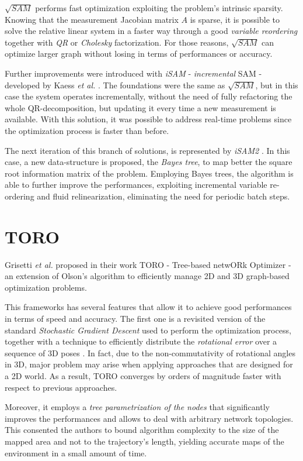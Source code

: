 $\sqrt{SAM}$ performs fast optimization exploiting the problem's intrinsic sparsity. Knowing that the measurement Jacobian matrix $A$ is sparse, it is possible to solve the relative linear system in a faster way through a good \textit{variable reordering} together with \textit{QR} or \textit{Cholesky} factorization. For those reasons, $\sqrt{SAM}$ can optimize larger graph without losing in terms of performances or accuracy.

Further improvements were introduced with \textit{iSAM} - \textit{incremental} SAM - developed by Kaess \textit{et al.} \cite{kaess2007isam}. The foundations were the same as $\sqrt{SAM}$, but in this case the system operates incrementally, without the need of fully refactoring the whole QR-decomposition, but updating it every time a new measurement is available. With this solution, it was possible to address real-time problems since the optimization process is faster than before. 

The next iteration of this branch of solutions, is represented by \textit{iSAM2} \cite{kaess2012isam2}. In this case, a new data-structure is proposed, the \textit{Bayes tree}, to map better the square root information matrix of the problem. Employing Bayes trees, the algorithm is able to further improve the performances, exploiting incremental variable re-ordering and fluid relinearization, eliminating the need for periodic batch steps. 

\section{TORO}
Grisetti \textit{et al.} proposed in their work TORO \cite{toro} - Tree-based netwORk Optimizer - an extension of Olson's algorithm to efficiently manage 2D and 3D graph-based optimization problems. 

This frameworks has several features that allow it to achieve good performances in terms of speed and accuracy. The first one is a revisited version of the standard \textit{Stochastic Gradient Descent} used to perform the optimization process, together with a technique to efficiently distribute the \textit{rotational error} over a sequence of 3D poses \cite{grisetti2007efficient}. In fact, due to the non-commutativity of rotational angles in 3D, major problem may arise when applying approaches that are designed for a 2D world. As a result, TORO converges by orders of magnitude faster with respect to previous approaches.

Moreover, it employs a \textit{tree parametrization of the nodes} \cite{grisetti2007tree} that significantly improves the performances and allows to deal with arbitrary network topologies. This consented the authors to bound algorithm complexity to the size of the mapped area and not to the trajectory's length, yielding accurate maps of the environment in a small amount of time.

